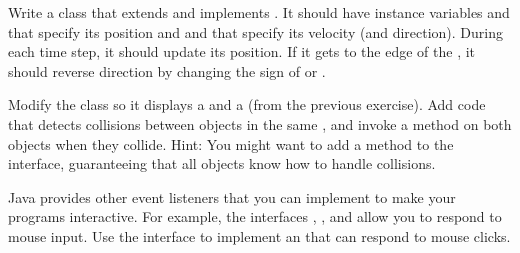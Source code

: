 \begin{exercise}
Write a class  that extends  and implements .
It should have instance variables  and  that specify its position and  and  that specify its velocity (and direction).
During each time step, it should update its position.
If it gets to the edge of the , it should reverse direction by changing the sign of  or .
\end{exercise}


\begin{exercise}
Modify the  class so it displays a  and a  (from the previous exercise).
Add code that detects collisions between  objects in the same , and invoke a method on both objects when they collide.
Hint: You might want to add a method to the  interface, guaranteeing that all  objects know how to handle collisions.
\end{exercise}


\begin{exercise}
Java provides other event listeners that you can implement to make your programs interactive.
For example, the interfaces , , and  allow you to respond to mouse input.
Use the  interface to implement an  that can respond to mouse clicks.
\end{exercise}
